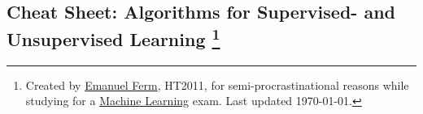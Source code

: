 \documentclass[landscape,a2paper,8pt]{article}
\begin{document}
\ifpdf
{}
\else
{}
\fi
% 
% 
% 
% 
\begin{center}
\section*{\sc \LARGE Cheat Sheet: Algorithms for Supervised- and Unsupervised Learning \footnote{Created by \href{http://eferm.com}{Emanuel Ferm}, HT2011, for semi-procrastinational reasons while studying for a \href{http://www.comlab.ox.ac.uk/teaching/courses/2010-2011/machinelearning/}{Machine Learning} exam. Last updated \today.}}
\end{center}
\end{document}
